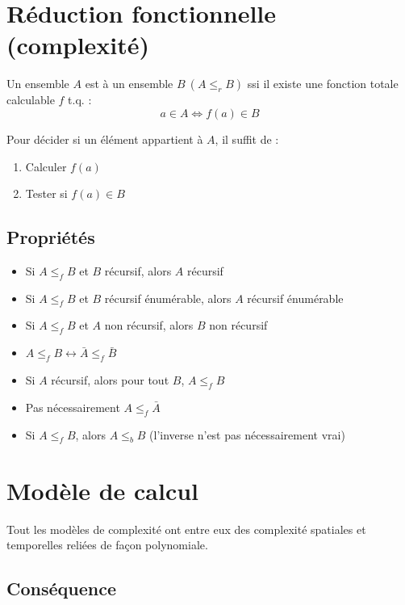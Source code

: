\section{Réduction fonctionnelle (complexité)}

Un ensemble $A$ est  à un ensemble $B \ (A \leq_r B)$ ssi il existe une fonction totale calculable $f$ t.q. :
\begin{equation*}
a \in A \Leftrightarrow f(a) \in B
\end{equation*}

Pour décider si un élément appartient à $A$, il suffit de :
\begin{enumerate}
\item Calculer $f(a)$
\item Tester si $f(a) \in B$
\end{enumerate}

\subsection{Propriétés}

\begin{itemize}
\item Si $A \leq_f B$ et $B$ récursif, alors $A$ récursif
\item Si $A \leq_f B$ et $B$ récursif énumérable, alors $A$ récursif énumérable
\item Si $A \leq_f B$ et $A$ non récursif, alors $B$ non récursif
\item $A \leq_f B \leftrightarrow \bar{A} \leq_f \bar{B}$
\item Si $A$ récursif, alors pour tout $B$, $A \leq_f B$
\item Pas nécessairement $A \leq_f \bar{A}$
\item Si $A \leq_f B$, alors $A \leq_b B$ (l'inverse n'est pas nécessairement vrai)
\end{itemize}

\section{Modèle de calcul}

Tout les modèles de complexité ont entre eux des complexité spatiales et temporelles reliées de façon polynomiale.

\subsection{Conséquence}

